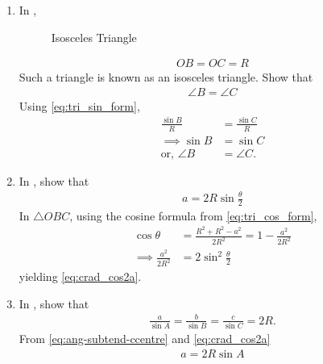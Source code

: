 \renewcommand{\theequation}{\theenumi}
\begin{enumerate}[label=\thesection.\arabic*.,ref=\thesection.\theenumi]
\item In 
	,	
\begin{figure}[!ht]
	\begin{center}
		\resizebox{\columnwidth}{!}{}
	\end{center}
	\caption{Isosceles Triangle}
	\label{fig:tri-isosc}	
\end{figure}
\begin{align}
	OB = OC=R
\end{align}
Such a triangle is known as an isosceles triangle.  Show that
\begin{align}
	\angle B = \angle C
\end{align}
\solution 
Using
\eqref{eq:tri_sin_form},
\begin{align}
	\frac{\sin B}{R} &= \frac{\sin C}{R}
	\\
\implies	{\sin B} &= {\sin C}
\\
	\text{or, } \angle B &= \angle C.
\end{align}
\item In 
	,	
	show that 
  \begin{align}
	  a = 2R \sin\frac{ \theta }{2}
\label{eq:crad_cos2a}
  \end{align}
		\solution In $\triangle OBC$,  using the cosine formula from
\eqref{eq:tri_cos_form},
\begin{align}
	\cos \theta &= \frac{R^2+R^2 - a^2}{2R^2} = 1 -\frac{a^2}{2R^2}
	\\
	\implies \frac{a^2}{2R^2}&= 2\sin^2\frac{\theta}{2}
\end{align}
yielding 
\eqref{eq:crad_cos2a}.
\item In
	,
show that 
\begin{align}
\label{eq:tri_crad_R}
\frac{a}{\sin A} = \frac{b}{\sin B} = \frac{c}{\sin C} = 2R.
\end{align}
%
%
\solution
From 
\eqref{eq:ang-subtend-ccentre}
and 
\eqref{eq:crad_cos2a}
  \begin{align}
	  a = 2R \sin A
  \end{align}


\end{enumerate}
